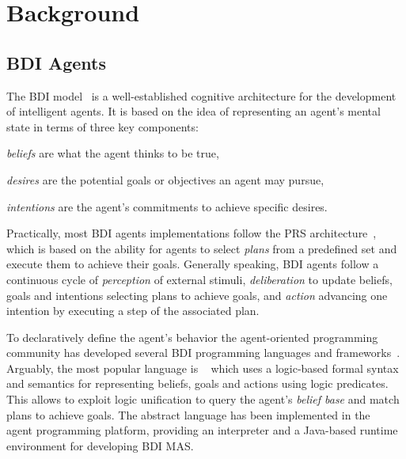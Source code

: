 \documentclass[
]{ceurart}
\begin{document}
\section{Background}
\label{sec:background}

\subsection{BDI Agents}

The \ac{BDI} model~\cite{DBLP:conf/atal/GeorgeffPPTW98}
is a well-established cognitive architecture for the development of intelligent agents.
%
It is based on the idea of representing an agent's mental state in terms of three key components:
\begin{inlinelist}
  \item \emph{beliefs} are what the agent thinks to be true,
  \item \emph{desires} are the potential goals or objectives an agent may pursue,
  \item \emph{intentions} are the agent's commitments to achieve specific desires.
\end{inlinelist}

Practically, most \ac{BDI} agents implementations follow the \ac{PRS} architecture~\cite{georgeff1986pieee},
which is based on the ability for agents to select \emph{plans} from a predefined set
and execute them to achieve their goals.
%
Generally speaking,
\ac{BDI} agents follow a continuous cycle of
\emph{perception} of external stimuli, 
\emph{deliberation} to update beliefs, goals and intentions selecting plans to achieve goals,
and \emph{action} advancing one intention by executing a step of the associated plan.

To declaratively define the agent's behavior the agent-oriented programming community has developed several \ac{BDI} programming languages and frameworks~\cite{DBLP:conf/woa/MascardiDA05}.
%
Arguably, the most popular language is \agentspeak{}~\cite{DBLP:conf/maamaw/Rao96} which 
uses a logic-based formal syntax and semantics for representing beliefs, goals and actions using logic predicates.
This allows to exploit logic unification to query the agent's \emph{belief base} and match plans to achieve goals.
The \agentspeak{} abstract language has been implemented in the \jason{}~\cite{bordini2007programming} agent programming platform, providing an interpreter and a Java-based runtime environment for developing \ac{BDI} \ac{MAS}.
\end{document}
